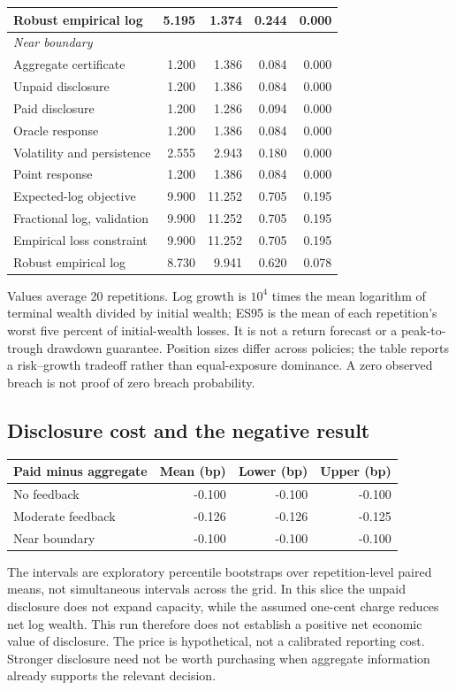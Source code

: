 {\begin{longtable}{p{}rrrr}
Robust empirical log & 5.195 & 1.374 & 0.244 & 0.000\\
\midrule
\multicolumn{5}{l}{\textit{Near boundary}}\\
Aggregate certificate & 1.200 & 1.386 & 0.084 & 0.000\\
Unpaid disclosure & 1.200 & 1.386 & 0.084 & 0.000\\
Paid disclosure & 1.200 & 1.286 & 0.094 & 0.000\\
Oracle response & 1.200 & 1.386 & 0.084 & 0.000\\
Volatility and persistence & 2.555 & 2.943 & 0.180 & 0.000\\
Point response & 1.200 & 1.386 & 0.084 & 0.000\\
Expected-log objective & 9.900 & 11.252 & 0.705 & 0.195\\
Fractional log, validation & 9.900 & 11.252 & 0.705 & 0.195\\
Empirical loss constraint & 9.900 & 11.252 & 0.705 & 0.195\\
Robust empirical log & 8.730 & 9.941 & 0.620 & 0.078\\
\midrule
\bottomrule
\end{longtable}}
Values average 20 repetitions. Log growth is $10^4$ times the mean logarithm
of terminal wealth divided by initial wealth; ES95 is the mean of each
repetition's worst five percent of initial-wealth losses. It is not a return
forecast or a peak-to-trough drawdown guarantee. Position sizes differ across
policies; the table reports a risk--growth tradeoff rather than equal-exposure
dominance. A zero observed breach is not proof of zero breach probability.

\subsection*{Disclosure cost and the negative result}
\begin{center}\small
\begin{tabular}{lrrr}
\toprule
Paid minus aggregate & Mean (bp) & Lower (bp) & Upper (bp)\\
\midrule
No feedback & -0.100 & -0.100 & -0.100\\
Moderate feedback & -0.126 & -0.126 & -0.125\\
Near boundary & -0.100 & -0.100 & -0.100\\
\bottomrule
\end{tabular}
\end{center}
The intervals are exploratory percentile bootstraps over repetition-level
paired means, not simultaneous intervals across the grid. In this slice the
unpaid disclosure does not expand capacity, while the assumed one-cent charge
reduces net log wealth. This run therefore does not establish a positive net
economic value of disclosure. The price is hypothetical, not a calibrated
reporting cost. Stronger disclosure need not be worth purchasing when aggregate
information already supports the relevant decision.

